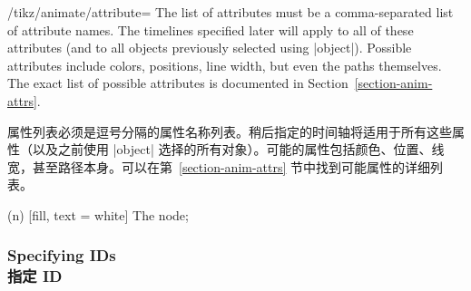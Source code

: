 \begin{key}{/tikz/animate/attribute=}
    The list of attributes must be a comma-separated list of attribute names.
    The timelines specified later will apply to all of these attributes (and to
    all objects previously selected using |object|). Possible attributes
    include colors, positions, line width, but even the paths themselves. The
    exact list of possible attributes is documented in
    Section~\ref{section-anim-attrs}.
    
    属性列表必须是逗号分隔的属性名称列表。稍后指定的时间轴将适用于所有这些属性（以及之前使用 |object| 选择的所有对象）。可能的属性包括颜色、位置、线宽，甚至路径本身。可以在第~\ref{section-anim-attrs} 节中找到可能属性的详细列表。


\begin{codeexample}[
    preamble={\usetikzlibrary{animations}},
    animation list={0.5,1,1.5,2},
]
\tikz [animate = {attribute = fill, n: = { 0s = "red", 2s = "blue",
                                           begin on = click } }]
  \node (n) [fill, text = white] {The node};
\end{codeexample}
\end{key}


\subsubsection{Specifying IDs\\指定 ID}
\label{section-anim-def-id}

